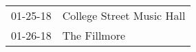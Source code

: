\begin{supertabular}{p{0.07\textwidth}p{0.23\textwidth}}
 01-25-18 &  College Street Music Hall \\
 01-26-18 &               The Fillmore \\
\end{supertabular}
